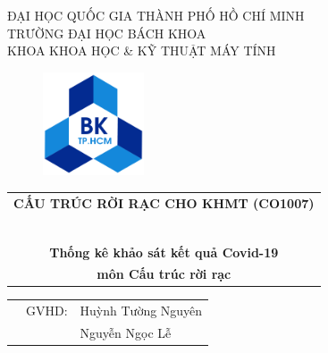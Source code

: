 \documentclass[a4paper]{article}
\theoremstyle{definition}
\begin{document}
\begin{titlepage}
\begin{center}
ĐẠI HỌC QUỐC GIA THÀNH PHỐ HỒ CHÍ MINH \\
TRƯỜNG ĐẠI HỌC BÁCH KHOA \\
KHOA KHOA HỌC \& KỸ THUẬT MÁY TÍNH 
\end{center}

\vspace{1cm}

\begin{figure}[h!]
\begin{center}
\includegraphics[width=3cm]{Images/hcmut.png}
\end{center}
\end{figure}

\vspace{1cm}


\begin{center}
\begin{tabular}{c}
\multicolumn{1}{l}{\textbf{{\Large CẤU TRÚC RỜI RẠC CHO KHMT (CO1007)}}}\\
~~\\
\hline
\\
\textbf{\large Thống kê khảo sát kết quả Covid-19}\\
\textbf{\large môn Cấu trúc rời rạc}
\\
\hline
\end{tabular}
\end{center}

\vspace{1.5cm}

\begin{table}[h]
\begin{tabular}{rrl}
\hspace{5 cm} & GVHD: & Huỳnh Tường Nguyên\\
\hspace{5 cm} &  & Nguyễn Ngọc Lễ\\


\end{tabular}
\end{table}
\end{titlepage}
\end{document}
